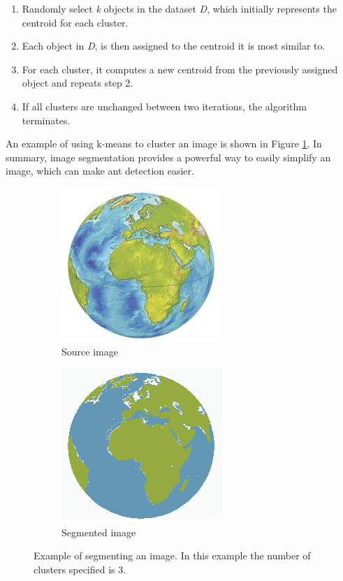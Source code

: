 \begin{enumerate}
  \item Randomly select \textit{k} objects in the dataset \textit{D}, which initially represents the centroid for each cluster.
  \item Each object in \textit{D}, is then assigned to the centroid it is most similar to.
  \item For each cluster, it computes a new centroid from the previously assigned object and repeats step 2.
  \item If all clusters are unchanged between two iterations, the algorithm terminates.
\end{enumerate}

An example of using k-means to cluster an image is shown in Figure \ref{fig:segmentation}. In summary, image segmentation provides a powerful way to easily simplify an image, which can make ant detection easier.\\

\begin{figure}
        \centering
        \begin{subfigure}[b]{0.3\textwidth}
                \includegraphics[scale = 0.5]{img/earth}
                \caption{Source image}
        \end{subfigure}
		\quad
        \begin{subfigure}[b]{0.3\textwidth}
                \includegraphics[scale = 0.5]{img/earth_segment}
                \caption{Segmented image}
        \end{subfigure}
		\caption{Example of segmenting an image. In this example the number of clusters specified is 3.}
		\label{fig:segmentation}
\end{figure}

